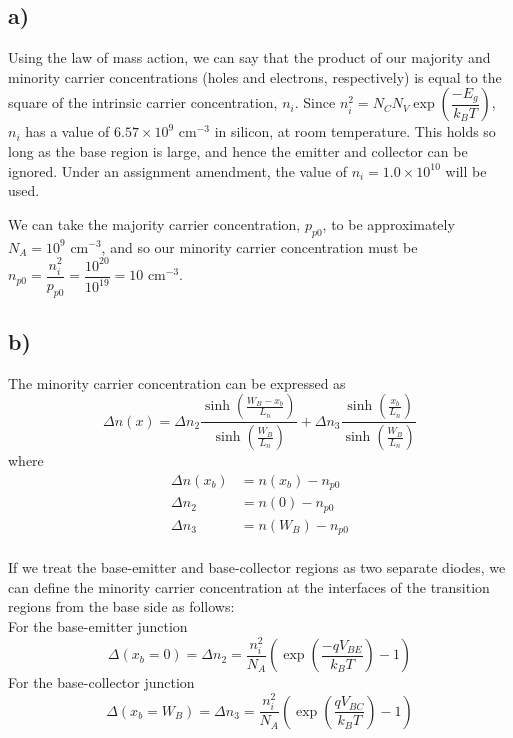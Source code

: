 \subsection*{a)}
	Using the law of mass action, we can say that the product of our majority and minority carrier concentrations (holes and electrons, respectively) is equal to the square of the intrinsic carrier concentration, $n_i$. Since $n_i^2 = N_C N_V \exp\left(\dfrac{-E_g}{k_B T}\right)$, $n_i$ has a value of $6.57 \times 10^{9} \textrm{ cm}^{-3}$ in silicon, at room temperature. This holds so long as the base region is large, and hence the emitter and collector can be ignored. Under an assignment amendment, the value of $n_i = 1.0 \times 10^{10}$ will be used.
	
	We can take the majority carrier concentration, $p_{p0}$, to be approximately $N_A = 10^9 \textrm{ cm}^{-3}$, and so our minority carrier concentration must be $n_{p0} = \dfrac{n_i^2}{p_{p0}} = \dfrac{10^{20}}{10^{19}} = 10 \textrm{ cm}^{-3}$.
\subsection*{b)}
	The minority carrier concentration can be expressed as
	$$\Delta n(x) = 
	\Delta n_2 \frac{\sinh\left(\frac{W_B - x_b}{L_n}\right)}{\sinh\left(\frac{W_B}{L_n}\right)} + 
	\Delta n_3 \frac{\sinh\left(\frac{x_b}{L_n}\right)}{\sinh\left(\frac{W_B}{L_n}\right)}
	$$	
	where
	\[
		\begin{aligned}
		\Delta n(x_b) &= n(x_b) - n_{p0} \\
		\Delta n_2  &= n(0) - n_{p0} \\
		\Delta n_3  &= n(W_B) - n_{p0} \\	
		\end{aligned}
	\]
	
	If we treat the base-emitter and base-collector regions as two separate diodes, we can define the minority carrier concentration at the interfaces of the transition regions from the base side as follows: \\
	
	\noindent For the base-emitter junction
	$$\Delta(x_b = 0) = \Delta n_2 
			= \frac{n_i^2}{N_A}
			 \left(
				\exp{\left(
					\frac{- q V_{BE}}{k_B T}				
				\right)} - 1
			\right)
	$$
	For the base-collector junction
	$$\Delta(x_b = W_B) = \Delta n_3
	= \frac{n_i^2}{N_A}
	\left(
		\exp{\left(
			\dfrac{q V_{BC}}{k_B T}				
		\right)} - 1
	\right)
	$$
	
